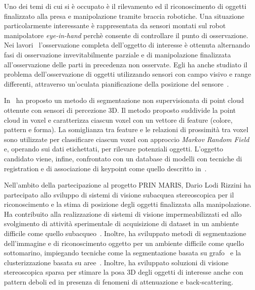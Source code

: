 \documentclass[11pt]{article}
\begin{document}
Uno dei temi di cui si \`e occupato \`e il rilevamento ed il riconoscimento di oggetti finalizzato 
alla presa e manipolazione tramite braccia robotiche. 
Una situazione particolarmente interessante \`e rappresentata da sensori montati sul robot manipolatore 
\emph{eye-in-hand} perch\`e consente di controllare il punto di osservazione. 
Nei lavori~\cite{aleotti2014jirs,aleotti2012icra} l'osservazione completa dell'oggetto di interesse
\`e ottenuta alternando fasi di osservazione invevitabilmente parziale e di manipolazione finalizzata 
all'osservazione delle parti in precedenza non osservate. 
Egli ha anche studiato il problema dell'osservazione di oggetti utilizzando sensori con campo visivo 
e range differenti, attraverso un'oculata pianificazione della posizione del sensore~\cite{aleotti2014iros}.

In~\cite{lodirizzini2014ias} ha proposto un metodo di segmentazione non supervisionata di 
point cloud ottenute con sensori di percezione 3D. 
Il metodo proposto suddivide la point cloud in voxel e caratterizza ciascun voxel con un vettore 
di feature (colore, pattern e forma). 
La somiglianza tra feature e le relazioni di prossimit\`a tra voxel sono utilizzate per classificare 
ciascun voxel con approccio \emph{Markov Random Field} e, operando sui dati etichettati, 
per rilevare potenziali oggetti. 
L'oggetto candidato viene, infine, confrontato con un database di modelli con tecniche di registration
e di associazione di keypoint come quello descritto in~\cite{oleari2013iccp}.
 
Nell'ambito della partecipazione al progetto PRIN MARIS,
Dario Lodi Rizzini ha partecipato allo sviluppo di sistemi di visione subacquea stereoscopica 
per il riconoscimento e la stima di posizione degli oggetti finalizzata alla manipolazione.
Ha contribuito alla realizzazione di sistemi di visione impermeabilizzati ed allo svolgimento
di attivit\`a sperimentale di acquisizione di dataset in un ambiente difficile come quello 
subacqueo~\cite{oleari2014ifac,oleari2015oceans}.
Inoltre, ha sviluppato metodi di segmentazione dell'immagine e di riconoscimento oggetto 
per un ambiente difficile come quello sottomarino, 
impiegando tecniche come la segmentazione basata su grafo~\cite{kallasi2015oceans} e 
la clusterizzazione basata su aree~\cite{lodirizzini2015ijars,oleari2014ifac,kallasi2014amra}.
Inoltre, ha sviluppato soluzioni di visione stereoscopica sparsa per stimare la posa 3D 
degli oggetti di interesse anche con pattern deboli ed in presenza di fenomeni di attenuazione 
e back-scattering. 
\end{document}
